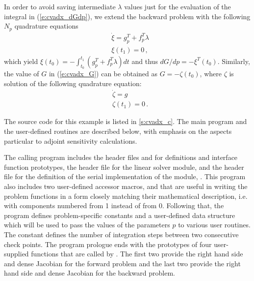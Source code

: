 In order to avoid saving intermediate $\lambda$ values just for the
evaluation of the integral in (\ref{e:cvadx_dGdp}), we extend the
backward problem with the following $N_p$ quadrature equations
\begin{equation}\label{e:cvadx_XI}
  \begin{split}
    &{\dot \xi} = g_p^T + f_p^T \lambda \\
    &\xi (t_1) = 0 \, ,
  \end{split}
\end{equation}
which yield $\xi(t_0) = - \int_{t_0}^{t_1} ( g_p^T + f_p^T \lambda) dt$
and thus ${dG}/{dp} = -\xi^T(t_0)$.
Similarly, the value of $G$ in (\ref{e:cvadx_G}) can be obtained as
$G = - \zeta(t_0)$, where $\zeta$ is solution of the following quadrature
equation:
\begin{equation}\label{e:cvadx_ZETA}
  \begin{split}
    &{\dot\zeta} = g \\
    &\zeta(t_1) = 0 \, .
  \end{split}
\end{equation}

The source code for this example is listed in \A\ref{s:cvadx_c}.
The main program and the user-defined routines are described below, 
with emphasis on the aspects particular to adjoint sensitivity calculations.

The calling program includes the {\cvodes} header files  
and  for {\cvodes} definitions and interface function prototypes,
the header file  for the {\cvdense} linear solver module, and
the header file  for the definition of the serial implementation
of the {\nvector} module, {\nvecs}.
This program also includes two user-defined accessor macros,
 and 
that are useful in writing the problem functions in a form closely
matching their mathematical description, i.e. with components numbered from 1 instead of from 0. 
Following that, the program defines problem-specific constants and a user-defined 
data structure which will be used to pass the values of the parameters $p$ to various
user routines. The constant  defines the number of integration steps
between two consecutive check points.
The program prologue ends with the prototypes of four user-supplied functions that are
called by {\cvodes}. The first two provide the right hand side and dense Jacobian
for the forward problem and the last two provide the right hand side and dense Jacobian 
for the backward problem.

